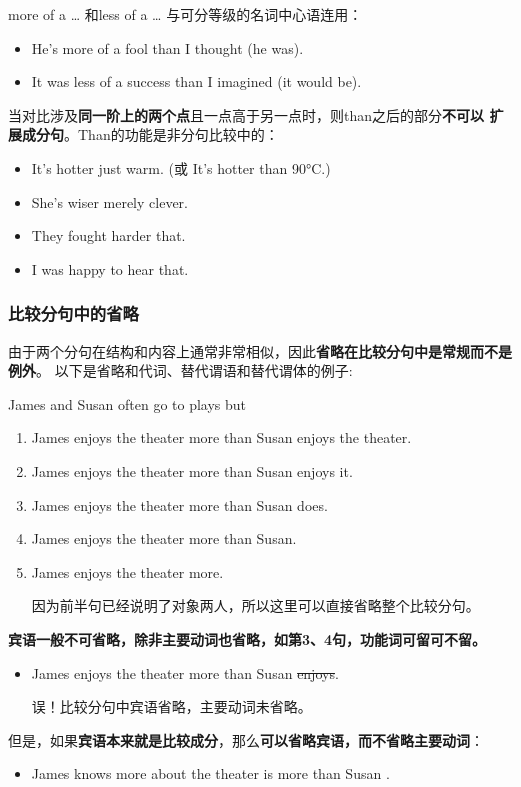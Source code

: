 more of a \ldots{} 和less of a \ldots{} 与可分等级的名词中心语连用：
\begin{itemize}
\item He's more of a fool than I thought (he was).

\item It was less of a success than I imagined (it would be).
\end{itemize}

当对比涉及\textbf{同一阶上的两个点}且一点高于另一点时，则than之后的部分\textbf{不可以
扩展成分句}。Than的功能是非分句比较中的：
\begin{itemize}
\item It's hotter  just warm. (或 It's hotter than 90°C.)
\item She's wiser  merely clever.
\item They fought harder  that.
\item I was  happy to hear that.
\end{itemize}

\subsubsection{比较分句中的省略}

由于两个分句在结构和内容上通常非常相似，因此\textbf{省略在比较分句中是常规而不是例外}。
以下是省略和代词、替代谓语和替代谓体的例子:

James and Susan often go to plays but
\begin{enumerate}
\item James enjoys the theater more than Susan enjoys the theater.
\item James enjoys the theater more than Susan enjoys it.
\item James enjoys the theater more than Susan does.
\item James enjoys the theater more than Susan.
\item James enjoys the theater more.

  因为前半句已经说明了对象两人，所以这里可以直接省略整个比较分句。
\end{enumerate}
\textbf{宾语一般不可省略，除非主要动词也省略，如第3、4句，功能词可留可不留。}
\begin{itemize}
\item James enjoys the theater more than Susan \sout{enjoys}.

  误！比较分句中宾语省略，主要动词未省略。
\end{itemize}
但是，如果\textbf{宾语本来就是比较成分}，那么\textbf{可以省略宾语，而不省略主要动词}：
\begin{itemize}
\item James knows more about the theater is more than Susan .
\end{itemize}


